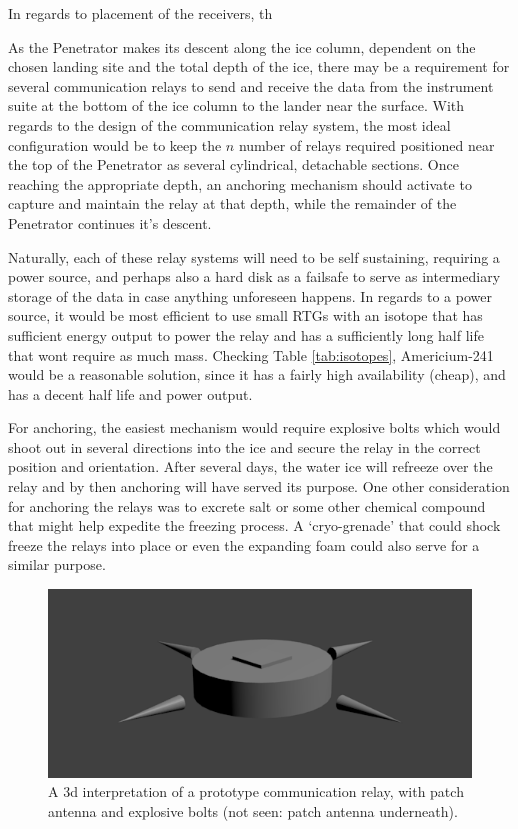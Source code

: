 In regards to placement of the receivers, th

As the Penetrator makes its descent along the ice column, dependent on the chosen landing site and the total depth of the ice, there may be a requirement for several communication relays to send and receive the data from the instrument suite at the bottom of the ice column to the lander near the surface. With regards to the design of the communication relay system, the most ideal configuration would be to keep the $n$ number of relays required positioned near the top of the Penetrator as several cylindrical, detachable sections. Once reaching the appropriate depth, an anchoring mechanism should activate to capture and maintain the relay at that depth, while the remainder of the Penetrator continues it's descent.

Naturally, each of these relay systems will need to be self sustaining, requiring a power source, and perhaps also a hard disk as a failsafe to serve as intermediary storage of the data in case anything unforeseen happens. In regards to a power source, it would be most efficient to use small RTGs with an isotope that has sufficient energy output to power the relay and has a sufficiently long half life that wont require as much mass. Checking Table \ref{tab:isotopes}, Americium-241 would be a reasonable solution, since it has a fairly high availability (cheap), and has a decent half life and power output.

For anchoring, the easiest mechanism would require explosive bolts which would shoot out in several directions into the ice and secure the relay in the correct position and orientation. After several days, the water ice will refreeze over the relay and by then anchoring will have served its purpose. One other consideration for anchoring the relays was to excrete salt or some other chemical compound that might help expedite the freezing process. A `cryo-grenade' that could shock freeze the relays into place or even the expanding foam could also serve for a similar purpose.

\begin{figure}[h!]
	\begin{center}
		\includegraphics[width=0.7\columnwidth]{figures/JP/comms_relay.png}
		\caption{A 3d interpretation of a prototype communication relay, with patch antenna and explosive bolts (not seen: patch antenna underneath).\label{fig:comms_relay}}
	\end{center}
\end{figure}

